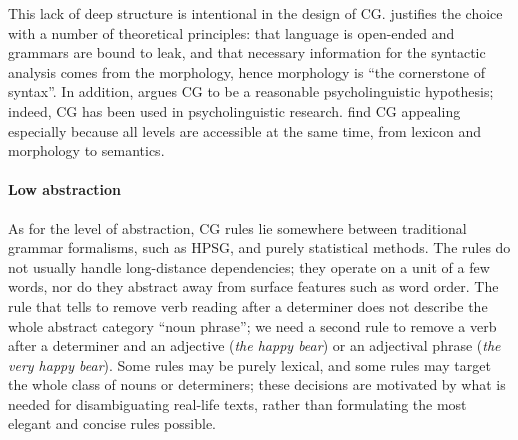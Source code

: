 This lack of deep structure is intentional in the design of CG.
\cite{karlsson1995constraint} justifies the choice with a number of
theoretical principles: that language is open-ended and grammars are
bound to leak, and that necessary information for the syntactic analysis
comes from the morphology, hence morphology is ``the cornerstone of
syntax''. 
In addition, \cite{karlsson1995constraint} argues CG to be a reasonable 
psycholinguistic hypothesis; indeed, CG has been used in psycholinguistic research.
 find CG appealing especially because all levels are accessible at the same time, from lexicon and morphology to semantics.






\paragraph{Low abstraction} 

As for the level of abstraction, CG rules lie somewhere between 
traditional grammar formalisms, such as HPSG, and purely statistical methods.
The rules do not usually handle long-distance dependencies; 
they operate on a unit of a few words, nor do they abstract away from surface features such as word order.
The rule that tells to remove verb reading after a determiner
does not describe the whole abstract category ``noun phrase''; we need a second
rule to remove a verb after a determiner and an adjective (\emph{the happy bear}) 
or an adjectival phrase (\emph{the very happy bear}).
Some rules may be purely lexical, and some rules may target the whole class of nouns or determiners; these decisions are motivated by what is needed for disambiguating real-life texts, rather than formulating the most elegant and concise rules possible.



